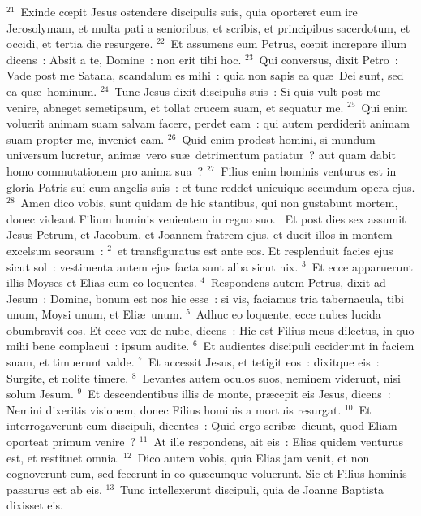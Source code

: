 ${}^{21}$~Exinde cœpit Jesus ostendere discipulis suis, quia oporteret eum ire Jerosolymam, et multa pati a senioribus, et scribis, et principibus sacerdotum, et occidi, et tertia die resurgere.
${}^{22}$~Et assumens eum Petrus, cœpit increpare illum dicens~: Absit a te, Domine~: non erit tibi hoc.
${}^{23}$~Qui conversus, dixit Petro~: Vade post me Satana, scandalum es mihi~: quia non sapis ea qu\ae\ Dei sunt, sed ea qu\ae\ hominum.
${}^{24}$~Tunc Jesus dixit discipulis suis~: Si quis vult post me venire, abneget semetipsum, et tollat crucem suam, et sequatur me.
${}^{25}$~Qui enim voluerit animam suam salvam facere, perdet eam~: qui autem perdiderit animam suam propter me, inveniet eam.
${}^{26}$~Quid enim prodest homini, si mundum universum lucretur, anim\ae\ vero su\ae\ detrimentum patiatur~? aut quam dabit homo commutationem pro anima sua~?
${}^{27}$~Filius enim hominis venturus est in gloria Patris sui cum angelis suis~: et tunc reddet unicuique secundum opera ejus.
${}^{28}$~Amen dico vobis, sunt quidam de hic stantibus, qui non gustabunt mortem, donec videant Filium hominis venientem in regno suo.
~Et post dies sex assumit Jesus Petrum, et Jacobum, et Joannem fratrem ejus, et ducit illos in montem excelsum seorsum~:
${}^{2}$~et transfiguratus est ante eos. Et resplenduit facies ejus sicut sol~: vestimenta autem ejus facta sunt alba sicut nix.
${}^{3}$~Et ecce apparuerunt illis Moyses et Elias cum eo loquentes.
${}^{4}$~Respondens autem Petrus, dixit ad Jesum~: Domine, bonum est nos hic esse~: si vis, faciamus tria tabernacula, tibi unum, Moysi unum, et Eli\ae\ unum.
${}^{5}$~Adhuc eo loquente, ecce nubes lucida obumbravit eos. Et ecce vox de nube, dicens~: Hic est Filius meus dilectus, in quo mihi bene complacui~: ipsum audite.
${}^{6}$~Et audientes discipuli ceciderunt in faciem suam, et timuerunt valde.
${}^{7}$~Et accessit Jesus, et tetigit eos~: dixitque eis~: Surgite, et nolite timere.
${}^{8}$~Levantes autem oculos suos, neminem viderunt, nisi solum Jesum.
${}^{9}$~Et descendentibus illis de monte, pr\ae cepit eis Jesus, dicens~: Nemini dixeritis visionem, donec Filius hominis a mortuis resurgat.
${}^{10}$~Et interrogaverunt eum discipuli, dicentes~: Quid ergo scrib\ae\ dicunt, quod Eliam oporteat primum venire~?
${}^{11}$~At ille respondens, ait eis~: Elias quidem venturus est, et restituet omnia.
${}^{12}$~Dico autem vobis, quia Elias jam venit, et non cognoverunt eum, sed fecerunt in eo qu\ae cumque voluerunt. Sic et Filius hominis passurus est ab eis.
${}^{13}$~Tunc intellexerunt discipuli, quia de Joanne Baptista dixisset eis.


